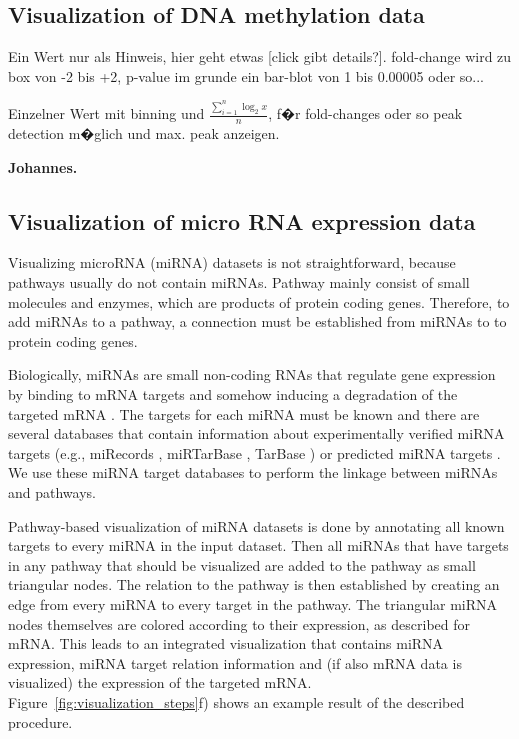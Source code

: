 \documentclass{bioinfo}
\begin{document}
\subsection{Visualization of DNA methylation data}

Ein Wert nur als Hinweis, hier geht etwas [click gibt details?]. fold-change wird zu box von -2 bis
+2, p-value im grunde ein bar-blot von 1 bis 0.00005 oder so...

Einzelner Wert mit binning und $\frac{\sum\limits_{i=1}^n\log_2 x}{n}$, f�r fold-changes oder so
peak detection m�glich und max. peak anzeigen.

\textbf{Johannes.}


\subsection{Visualization of micro RNA expression data}

Visualizing microRNA (miRNA) datasets is not straightforward, because pathways usually do not
contain miRNAs. Pathway mainly consist of small molecules and enzymes, which are products of protein
coding genes. Therefore, to add miRNAs to a pathway, a connection must be established from miRNAs to
to protein coding genes.

Biologically, miRNAs are small non-coding RNAs that regulate gene expression by binding to mRNA
targets and somehow inducing a degradation of the targeted mRNA \citep{Bartel2004}. The targets for
each miRNA must be known and there are several databases that contain information about
experimentally verified miRNA targets (e.g., miRecords \citep[see][]{miRecords}, miRTarBase
\citep[see][]{miRTarBase}, TarBase \citep[see][]{TarBase}) or predicted miRNA targets
\citep{Alexiou2009}. We use these miRNA target databases to perform the linkage between miRNAs and
pathways.

Pathway-based visualization of miRNA datasets is done by annotating all known targets to every miRNA
in the input dataset. Then all miRNAs that have targets in any pathway that should be visualized are
added to the pathway as small triangular nodes. The relation to the pathway is then established by
creating an edge from every miRNA to every target in the pathway. The triangular miRNA nodes
themselves are colored according to their expression, as described for mRNA.  This leads to an
integrated visualization that contains miRNA expression, miRNA target relation information and (if
also mRNA data is visualized) the expression of the targeted
mRNA. Figure~\ref{fig:visualization_steps}f) shows an example result of the described procedure.
\end{document}

